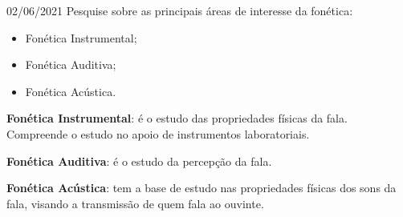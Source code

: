 \documentclass{SchoolBook}
\begin{document}
    \begin{day}{02/06/2021}
        Pesquise sobre as principais áreas de interesse da fonética:
        
        \begin{itemize}[nosep]
            \item Fonética Instrumental;
            \item Fonética Auditiva;
            \item Fonética Acústica.
        \end{itemize}
        
        \noindent\textbf{Fonética Instrumental}: é o estudo das propriedades físicas da fala. Compreende o estudo no apoio de instrumentos laboratoriais.
        
        \noindent\textbf{Fonética Auditiva}: é o estudo da percepção da fala.
        
        \noindent\textbf{Fonética Acústica}: tem a base de estudo nas propriedades físicas dos sons da fala, visando a transmissão de quem fala ao ouvinte.
    \end{day}
    
\end{document}
